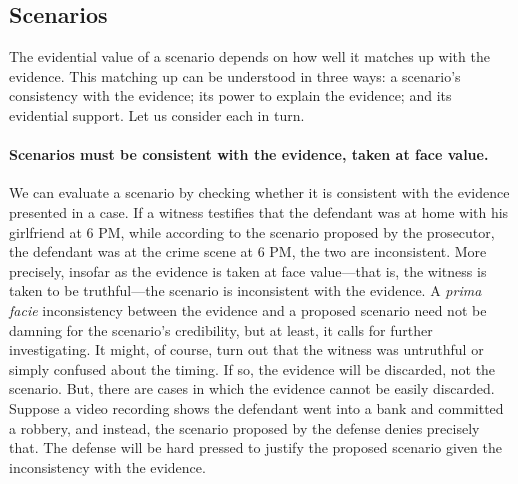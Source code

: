 \documentclass[10pt]{article}
\begin{document}

\subsection{Scenarios}

The evidential value of a scenario depends on how well it matches up with the evidence. 
This matching up can be understood in three ways: a scenario's consistency 
with the evidence; its power to explain the evidence; 
and its evidential support. Let us consider each in turn.


\paragraph{Scenarios must be consistent with the evidence, taken at face value.}

We can evaluate a scenario by checking whether it is consistent with the evidence presented in a case.
If a witness testifies that the defendant was at home with his girlfriend 
at 6 PM, while according to the scenario proposed by the prosecutor, 
the defendant was at the crime scene at 6 PM, the 
two are inconsistent. More precisely, insofar as the evidence 
is taken at face value---that is, the witness is taken to be truthful---the scenario 
is inconsistent with the evidence. A \textit{prima facie} inconsistency 
between the evidence and a proposed scenario need not be damning for the scenario's credibility, 
but at least, it calls for further investigating.  It might, of course, turn out that the witness was untruthful or simply confused about 
the timing.  If so, the evidence will be discarded, not the scenario. But, there are cases in which the evidence 
cannot be easily discarded. Suppose a video recording shows the defendant went into a bank 
and committed a robbery, and instead, the scenario proposed by the defense denies precisely that. The defense 
will be hard pressed to justify the proposed scenario given the inconsistency 
with the evidence. 
\end{document}
